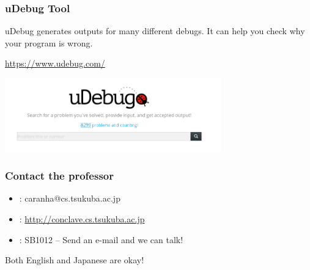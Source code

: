 \documentclass{beamer}
\begin{document}
\begin{frame}
  \frametitle{uDebug Tool}

  uDebug generates outputs for many different debugs. It can help you check why your program is wrong.

  \bigskip

  \url{https://www.udebug.com/}

  \bigskip

  \begin{center}
    \includegraphics[width=0.7\textwidth]{../img/udebug}
  \end{center}
\end{frame}

%
%
%
%
%


\begin{frame}
  \frametitle{Contact the professor}
  \begin{itemize}
  \item {}: caranha@cs.tsukuba.ac.jp
  \item {}: \url{http://conclave.cs.tsukuba.ac.jp}

    \bigskip

  \item {}: SB1012 -- Send an e-mail and we can talk!\\
  \end{itemize}

  \bigskip

  Both English and Japanese are okay!
\end{frame}


\end{document}
